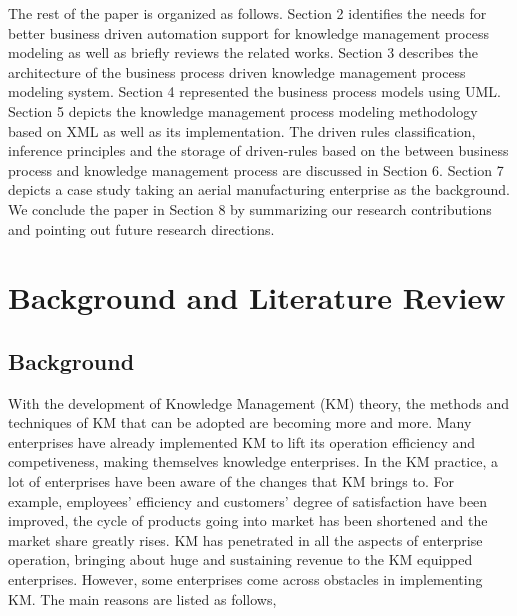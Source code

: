 \documentclass{elsarticle}
\begin{document}
\textrm{The rest of the paper is organized as follows. Section 2
identifies the }\textrm{{needs}}\textrm{ for better
business driven automation support for knowledge management process
modeling as well as briefly reviews the related works. Section 3
describes the architecture of the business process driven knowledge
management process modeling system. Section 4 represented the business
process models using UML. Section 5 depicts the knowledge management
process modeling methodology based on XML as well as its
implementation. The driven rules classification, inference principles
and the storage of driven-rules based on the
between
business process and knowledge management process are discussed in
Section 6. Section 7 depicts a
case study taking an aerial manufacturing  enterprise as the background. We
conclude the paper in Section 8 by summarizing our research
contributions }\textrm{and pointing out future research directions.}

\section{ Background and Literature Review}
\label{sec:backgr-liter-revi}

\subsection{Background}
\label{sec:background}


With the development of Knowledge Management (KM) theory, the
methods and techniques of KM that can be adopted are becoming more and
more. Many enterprises have already implemented KM to lift its
operation efficiency and competiveness, making themselves knowledge
enterprises. In the KM practice, a lot of enterprises have been aware
of the changes that KM brings to. For example,
employees' efficiency and customers'
degree of satisfaction have been improved, the cycle of products going
into market has been shortened and the market share greatly rises. KM
has penetrated in all the aspects of enterprise operation, bringing
about huge and sustaining revenue to the KM equipped enterprises.
However, some enterprises come across obstacles in implementing KM. The
main reasons are listed as follows,
\end{document}
